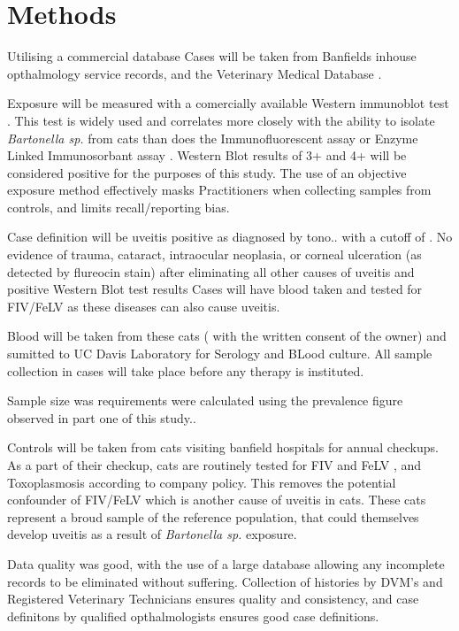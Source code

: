 \documentclass[11pt,twocolumn]{article}
\begin{document}
\section{Methods}
	Utilising a commercial database
	Cases will be taken from Banfields inhouse opthalmology service records, and the Veterinary Medical Database \cite{UniversityVeterinary}.

	Exposure will be measured with a comercially available Western immunoblot test \cite{febart}. This test is widely used and correlates more closely with the ability to isolate \emph{Bartonella sp.} from cats than does the Immunofluorescent assay or Enzyme Linked Immunosorbant assay \cite{Jr1995}. 
	Western Blot results of 3+ and 4+ will be considered positive for the purposes of this study. 
	The use of an objective exposure method effectively masks Practitioners when collecting samples from controls, and limits recall/reporting bias.


	Case definition will be uveitis positive as diagnosed by tono.. with a cutoff of .
	No evidence of trauma, cataract, intraocular neoplasia, or corneal ulceration (as detected by flureocin stain) 
	after eliminating all other causes of uveitis and positive Western Blot test results
	Cases will have blood taken and tested for FIV/FeLV as these diseases can also cause uveitis.

	Blood will be taken from these cats ( with the written consent of the owner) and sumitted to UC Davis Laboratory for Serology and BLood culture.
	All sample collection in cases will take place before any therapy is instituted.

	Sample size was requirements were calculated using the prevalence figure observed in part one of this study..

	Controls will be taken from cats visiting banfield hospitals for annual checkups. As a part of their checkup, cats are routinely tested for FIV and FeLV , and Toxoplasmosis according to company policy. This removes the potential confounder of FIV/FeLV which is another cause of uveitis in cats. These cats represent a broud sample of the reference population, that could themselves develop uveitis as a result of \emph{Bartonella sp.} exposure.

	Data quality was good, with the use of a large database allowing any incomplete records to be eliminated without suffering.
	Collection of histories by DVM's and Registered Veterinary Technicians ensures quality and consistency, and case definitons by qualified opthalmologists ensures good case definitions.
\end{document}
